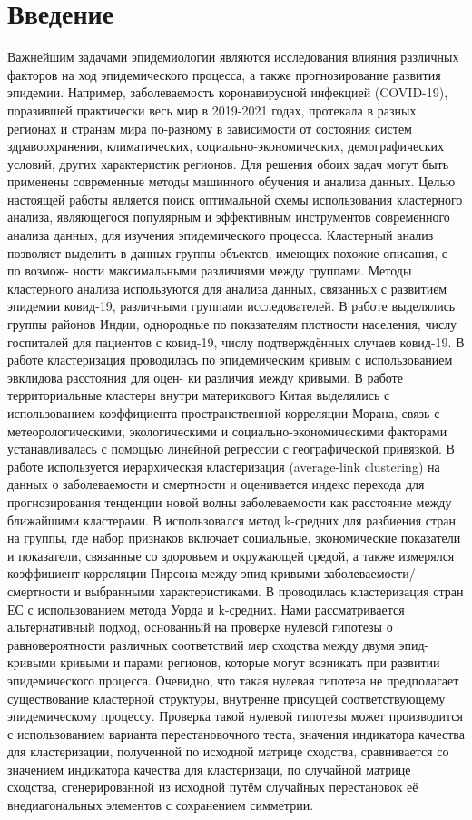 \documentclass{article}
\begin{document}
\section{Введение}
Важнейшим задачами эпидемиологии являются исследования влияния различных факторов на ход эпидемического процесса, а также прогнозирование развития эпидемии. Например, заболеваемость коронавирусной инфекцией (COVID-19), поразившей практически весь мир в 2019-2021 годах, протекала в разных регионах и странам мира по-разному в зависимости от состояния систем здравоохранения, климатических, социально-экономических, демографических условий, других характеристик регионов. Для решения обоих задач могут быть применены современные методы машинного обучения и анализа данных. Целью настоящей работы является поиск оптимальной схемы использования кластерного анализа, являющегося популярным и эффективным инструментов современного анализа данных, для изучения эпидемического процесса. Кластерный анализ позволяет выделить в данных группы объектов, имеющих похожие описания, с по возмож-
ности максимальными различиями между группами. 
Методы кластерного анализа используются для анализа данных, связанных с развитием эпидемии ковид-19, различными группами исследователей. В работе \cite{1} выделялись группы районов Индии, однородные по показателям плотности населения, числу госпиталей для пациентов с ковид-19, числу подтверждённых случаев ковид-19. В работе \cite{2}кластеризация проводилась по эпидемическим кривым с использованием эвклидова расстояния для оцен-
ки различия между кривыми. В работе \cite{3} территориальные кластеры внутри материкового Китая выделялись с использованием коэффициента пространственной корреляции Морана, связь с метеорологическими, экологическими и социально-экономическими факторами устанавливалась с помощью линейной регрессии с географической привязкой. В работе \cite{4} используется иерархическая кластеризация (average-link clustering) на данных о заболеваемости и смертности и оценивается индекс перехода для прогнозирования тенденции новой волны заболеваемости как расстояние между ближайшими кластерами. В \cite{5} использовался метод k-средних для разбиения стран на группы, где набор признаков включает социальные, экономические показатели и показатели, связанные со здоровьем и окружающей средой, а также измерялся коэффициент корреляции Пирсона между эпид-кривыми заболеваемости/смертности и выбранными характеристиками. В \cite{6} проводилась кластеризация стран ЕС с использованием метода Уорда и k-средних.
Нами рассматривается альтернативный подход, основанный на проверке нулевой гипотезы о равновероятности различных соответствий мер сходства между двумя эпид-кривыми кривыми и парами регионов, которые могут возникать при развитии эпидемического процесса.
Очевидно, что такая нулевая гипотеза не предполагает существование кластерной структуры, внутренне присущей соответствующему эпидемическому процессу. Проверка такой нулевой гипотезы может производится с использованием варианта перестановочного теста, значения индикатора качества для кластеризации, полученной по исходной матрице сходства, сравнивается со значением индикатора качества для кластеризаци, по случайной матрице сходства, сгенерированной из исходной путём случайных перестановок её внедиагональных
элементов с сохранением симметрии.
\end{document}
